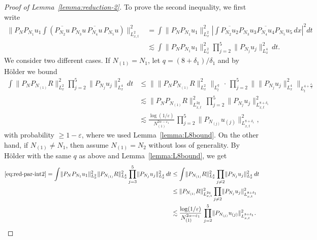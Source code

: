 \documentclass[11pt, xcolor = dvipsnames,reqno
]{amsart}
\theoremstyle{definition}
\theoremstyle{remark}
\begin{document}
\begin{proof}[Proof of Lemma~\ref{lemma:reduction-2}]
To prove the second inequality, we first write
\begin{align}\label{eq:red-par-int2}
    \big\lVert 
    P_N P_{N_1} u_1
    \int \left(
    \overline{P_{N_2} u} \, 
    P_{N_3}u \, 
    \overline{P_{N_4}u} \, 
    P_{N_5}u \right) 
    \big\|_{L^2_{x,t}}^2 \nonumber 
    & =
    \int 
    \lVert P_N P_{N_1} u_1 \rVert_{L^2_x}^2
    \left|
    \int 
    \overline{P_{N_2} u_2} 
    P_{N_3}u_3 
    \overline{P_{N_4}u_4} 
    P_{N_5}u_5 \, dx \right|^2
    dt  \\
    & \lesssim 
    \int 
    \lVert P_N P_{N_1} u_1 \rVert_{L^2_x}^2
    \prod_{j=2}^5
    \lVert P_{N_j} u_j \rVert_{L^4_x}^2 \, 
    dt. 
\end{align}
We consider two different cases.  
If $N_{(1)} = N_1$, 
let $q = (8+\delta_1)/\delta_1$ and by H\"older we bound
\begin{align}
    \int 
    \lVert P_N P_{N_{(1)}} R \rVert_{L^2_x}^2
    \prod_{j=2}^5
    \lVert P_{N_j} u_j \rVert_{L^4_x}^2 \, 
    dt 
    & \leq
    \big\lVert \lVert P_N P_{N_{(1)}} R \rVert_{L^2_x}^2 
    \big\rVert_{L^q_t} \, \cdot \, 
    \prod_{j=2}^5
    \big\lVert \lVert P_{N_j} u_j \rVert_{L^4_x}^2 
    \big\rVert_{L^{4+\frac{\delta_1}{2}}_t} \\
    & \lesssim 
    \lVert P_N P_{N_{(1)}} R 
    \rVert_{L^{2q}_{x,t}}^2 \, 
    \prod_{j=2}^5
    \lVert P_{N_j} u_j
    \rVert_{L^{8+\delta_1}_{x,t}}^2 \\
    & \lesssim 
    \frac{\log(1/\varepsilon)}{N_{(1)}^{2\alpha - \varepsilon_1}} \, 
    \prod_{j=2}^5
    \lVert P_{N_{(j)}} u_{(j)}
    \rVert_{L^{8+\delta_1}_{x,t}}^2,
\end{align}
with probability $\geq 1 - \varepsilon$, where we used Lemma~\ref{lemma:L8bound}. 
On the other hand, if $N_{(1)} \neq N_1$, 
then assume $N_{(1)} = N_2$ without loss of generality. By H\"older with the same $q$ as above and Lemma~\ref{lemma:L8bound}, we get
\begin{align}
    \eqref{eq:red-par-int2} = \int 
    \lVert P_N P_{N_1} u_1 \rVert_{L^2_x}^2
    \lVert P_{N_{(1)}} R \rVert_{L^4_x}^2
    \prod_{j=3}^5
    \lVert P_{N_j} u_j \rVert_{L^4_x}^2 \, 
    dt 
    & \leq 
    \int 
    \lVert P_{N_{(1)}} R \rVert_{L^4_x}^2
    \prod_{j\neq 2}
    \lVert P_{N_j} u_j \rVert_{L^4_x}^2 \, 
    dt \\
    & \leq 
    \lVert P_{N_{(1)}} R \rVert_{L^{2q}_{x,t}}^2
    \prod_{j\neq 2}
    \lVert P_{N_j} u_j \rVert_{L^{8+\delta_1}_{x,t}}^2 \\
    & \lesssim 
    \frac{\log(1/\varepsilon)}{N_{(1)}^{2\alpha - \varepsilon_1}} \, 
    \prod_{j=2}^5
    \lVert P_{N_{(j)}} u_{(j)}
    \rVert_{L^{8+\delta_1}_{x,t}}^2.
    \qedhere
\end{align} 
\end{proof}
\end{document}
